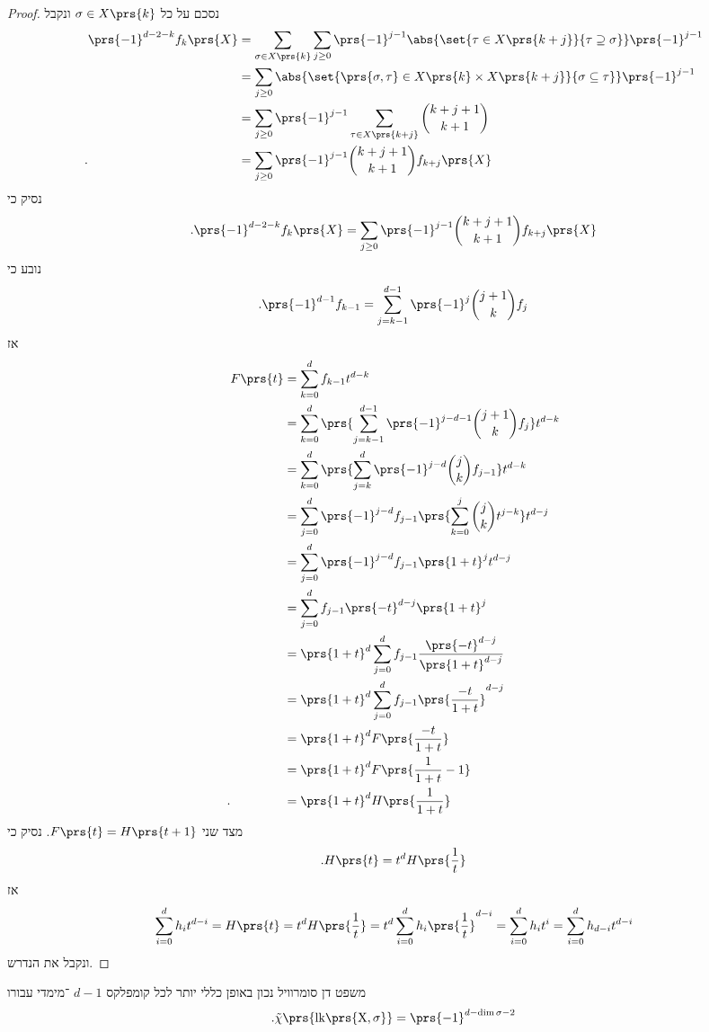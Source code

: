 \documentclass[a4paper,10pt,twoside,openany]{book}
\begin{document}
\begin{proof}
נסכם על כל
$\sigma \in X\prs{k}$
ונקבל
\begin{align*}
\prs{-1}^{d-2-k} f_k\prs{X} &= \sum_{\sigma \in X\prs{k}} \sum_{j \geq 0} \prs{-1}^{j-1} \abs{\set{\tau \in X\prs{k+j}}{\tau \supseteq \sigma}} \prs{-1}^{j-1}
\\&=
\sum_{j \geq 0} \abs{\set{\prs{\sigma,\tau} \in X\prs{k} \times X\prs{k+j}}{\sigma \subseteq \tau}} \prs{-1}^{j-1}
\\&=
\sum_{j \geq 0} \prs{-1}^{j-1} \sum_{\tau \in X\prs{k+j}} \binom{k+j+1}{k+1}
\\\text{.} \hphantom{\prs{-1}^{d-2-k} f_k\prs{X}} &=
\sum_{j \geq 0} \prs{-1}^{j-1} \binom{k+j+1}{k+1} f_{k+j}\prs{X}
\end{align*}
נסיק כי
\[\text{.} \prs{-1}^{d-2-k} f_k\prs{X} = \sum_{j \geq 0} \prs{-1}^{j-1} \binom{k+j+1}{k+1} f_{k+j}\prs{X}\]
נובע כי
\[\text{.} \prs{-1}^{d-1} f_{k-1} = \sum_{j=k-1}^{d-1} \prs{-1}^j \binom{j+1}{k} f_j\]
אז
\begin{align*}
F\prs{t} &= \sum_{k=0}^d f_{k-1} t^{d-k}
\\&= \sum_{k=0}^d \prs{\sum_{j=k-1}^{d-1} \prs{-1}^{j-d-1} \binom{j+1}{k} f_j} t^{d-k}
\\&= \sum_{k=0}^d \prs{\sum_{j=k}^d \prs{-1}^{j-d} \binom{j}{k} f_{j-1}} t^{d-k}
\\&= \sum_{j=0}^d \prs{-1}^{j-d} f_{j-1} \prs{\sum_{k=0}^j \binom{j}{k} t^{j-k}} t^{d-j}
\\&= \sum_{j=0}^d \prs{-1}^{j-d} f_{j-1} \prs{1+t}^j t^{d-j}
\\&= \sum_{j=0}^d f_{j-1} \prs{-t}^{d-j} \prs{1+t}^j
\\&= \prs{1+t}^{d} \sum_{j=0}^d f_{j-1} \frac{\prs{-t}^{d-j}}{\prs{1+t}^{d-j}} 
\\&= \prs{1+t}^{d} \sum_{j=0}^d f_{j-1} \prs{\frac{-t}{1+t}}^{d-j}
\\&= \prs{1+t}^d F\prs{\frac{-t}{1+t}}
\\&= \prs{1+t}^d F\prs{\frac{1}{1+t} - 1}
\\ \text{.} \hphantom{F\prs{t}}&= \prs{1+t}^d H\prs{\frac{1}{1+t}}
\end{align*}
מצד שני
$F\prs{t} = H\prs{t+1}$.
נסיק כי
\[\text{.} H\prs{t} = t^d H\prs{\frac{1}{t}}\]
אז
\[\sum_{i=0}^d h_i t^{d-i} = H\prs{t} = t^d H\prs{\frac{1}{t}} = t^d \sum_{i=0}^d h_i \prs{\frac{1}{t}}^{d-i} = \sum_{i=0}^d h_i t^i = \sum_{i=0}^d h_{d-i} t^{d-i}\]
ונקבל את הנדרש.
\end{proof}

\begin{remark}
משפט דן סומרוויל נכון באופן כללי יותר לכל קומפלקס
$d-1$%
־מימדי עבורו
\[\text{.} \tilde{\chi}\prs{\rm{lk}\prs{X,\sigma}} = \prs{-1}^{d-\dim \sigma - 2}\]
\end{remark}
\end{document}
